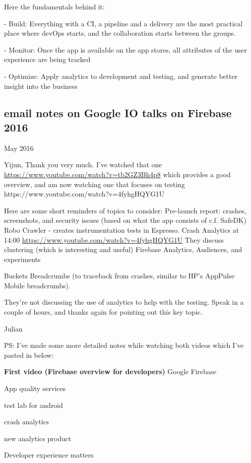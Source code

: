  

Here the fundamentals behind it:

-          Build: Everything with a CI, a pipeline and a delivery are the most practical place where devOps starts, and the collaboration starts between the groups.

-          Monitor: Once the app is available on the app stores, all attributes of the user experience are being tracked

-          Optimize: Apply analytics to development and testing, and generate better insight into the business

\subsection{email notes on Google IO talks on Firebase 2016}
 May 2016

Yijun,
Thank you very much. I've watched that one \url{https://www.youtube.com/watch?v=tb2GZ3Bh4p8} which provides a good overview, and am now watching one that focuses on testing https://www.youtube.com/watch?v=4fyhgHQYG1U 

Here are some short reminders of topics to consider:
Pre-launch report: crashes, screenshots, and security issues (based on what the app consists of c.f. SafeDK)
Robo Crawler - creates instrumentation tests in Espresso. 
Crash Analytics at 14:00 \url{https://www.youtube.com/watch?v=4fyhgHQYG1U} They discuss clustering (which is interesting and useful)
Firebase Analytics, Audiences, and experiments

Buckets
Breadcrumbs (to traceback from crashes, similar to HP's AppPulse Mobile breadcrumbs).

They're not discussing the use of analytics to help with the testing. 
Speak in a couple of hours, and thanks again for pointing out this key topic.

Julian

PS: I've made some more detailed notes while watching both videos which I've pasted in below:

\textbf{First video (Firebase overview for developers)}
Google Firebase

App quality services

test lab for android

crash analytics

new analytics product

Developer experience matters

